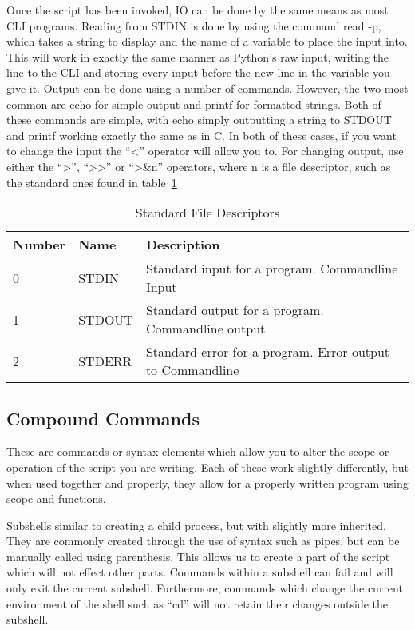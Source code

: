 			Once the script has been invoked, IO can be done by the same means as most CLI programs.
			Reading from STDIN is done by using the command read -p, which takes a string to display and the name of a variable to place the input into.
			This will work in exactly the same manner as Python's raw input, writing the line to the CLI and storing every input before the new line in the variable you give it.
			Output can be done using a number of commands.
			However, the two most common are echo for simple output and printf for formatted strings.
			Both of these commands are simple, with echo simply outputting a string to STDOUT and printf working exactly the same as in C.
			In both of these cases, if you want to change the input the ``<'' operator will allow you to.
			For changing output, use either the ``>'', ``>{}>'' or ``>\&n'' operators, where n is a file descriptor, such as the standard ones found in table~\ref{tab:stdFileDescriptors}
			\begin{table}[htb]
				\centering
				\begin{adjustbox}{max width=1\textwidth}
				\begin{tabular}{ll p{9cm}}
					\toprule
					\textbf{Number} & \textbf{Name} & \textbf{Description} \\
					\toprule
					0 & STDIN & Standard input for a program. Commandline Input \\
					1 & STDOUT & Standard output for a program. Commandline output \\
					2 & STDERR & Standard error for a program. Error output to Commandline \\
					\bottomrule
				\end{tabular}
				\end{adjustbox}
				\caption{Standard File Descriptors}
				\label{tab:stdFileDescriptors}
			\end{table}

		\subsection{Compound Commands}
			These are commands or syntax elements which allow you to alter the scope or operation of the script you are writing.
			Each of these work slightly differently, but when used together and properly, they allow for a properly written program using scope and functions.

			Subshells similar to creating a child process, but with slightly more inherited.
			They are commonly created through the use of syntax such as pipes, but can be manually called using parenthesis.
			This allows us to create a part of the script which will not effect other parts.
			Commands within a subshell can fail and will only exit the current subshell.
			Furthermore, commands which change the current environment of the shell such as ``cd'' will not retain their changes outside the subshell.

